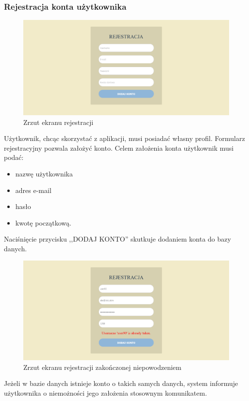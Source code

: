 \documentclass[12pt,a4paper,oneside]{article}
\begin{document}
\subsubsection{Rejestracja konta użytkownika}
\begin{figure}[H]
    \centering
    \includegraphics[width=\hsize,keepaspectratio]{images/register.png}
    \caption{Zrzut ekranu rejestracji}
\end{figure}
Użytkownik, chcąc skorzystać z aplikacji, musi posiadać własny profil. Formularz
rejestracyjny pozwala założyć konto. Celem założenia konta użytkownik musi podać:
\begin{itemize}
    \item nazwę użytkownika
    \item adres e-mail
    \item hasło
    \item kwotę początkową.
\end{itemize}
Naciśnięcie przycisku ,,DODAJ KONTO'' skutkuje dodaniem konta do bazy danych.

\begin{figure}[H]
    \centering
    \includegraphics[width=\hsize,keepaspectratio]{images/register_account_exists.png}
    \caption{Zrzut ekranu rejestracji zakończonej niepowodzeniem}
\end{figure}
Jeżeli w bazie danych istnieje konto o takich samych danych, system informuje
użytkownika o niemożności jego założenia stosownym komunikatem.
\end{document}
